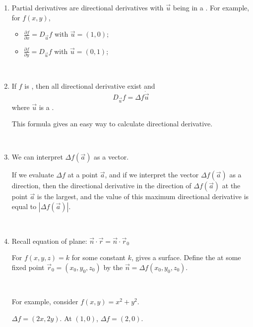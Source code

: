 \documentclass[11pt,fleqn]{book} %
\begin{document}
\begin{enumerate}
    \item Partial derivatives are directional derivatives with $\vec{u}$ being in a . For example, for $f(x,y)$, 

    \begin{itemize}
        \item $\frac{\partial f}{\partial x} = D_{\vec{u}} f$ with $\vec{u} = (1, 0)$;
        \item $\frac{\partial f}{\partial y} = D_{\vec{u}} f$ with $\vec{u} = (0, 1)$;
    \end{itemize}

    {~~~}

    \item If $f$ is , then all directional derivative exist and $$D_{\vec{u}} f = \Delta f \dot \vec{u}$$ where $\vec{u}$ is a . 
    
    This formula gives an easy way to calculate directional derivative.

    {~~~}

    \item We can interpret $\Delta f(\vec{a})$ as a vector. 
    
    If we evaluate $\Delta f$ at a point $\vec{a}$, and if we interpret the vector $\Delta f(\vec{a})$ as a direction, then the directional derivative in the direction of $\Delta f(\vec{a})$ at the point $\vec{a}$ is the largest, and the value of this maximum directional derivative is equal to $| \Delta f(\vec{a}) |$. 

    {~~~}

    \item Recall equation of plane: $\vec{n} \cdot \vec{r} = \vec{n} \cdot \vec{r}_0$
    
    For $f(x, y, z) = k$ for some constant $k$, gives a  surface. Define the  at some fixed point $\vec{r}_0 = (x_0, y_0, z_0)$ by the  $\vec{n} = \Delta f(x_0, y_0, z_0)$.

    {~~~}

    For example, consider $f(x,y) = x^2 + y^2$. 

    $\Delta f = (2x, 2y)$. At $(1,0)$, $\Delta f = (2,0)$. 

    \begin{center}
\end{center}
\end{enumerate}
\end{document}
